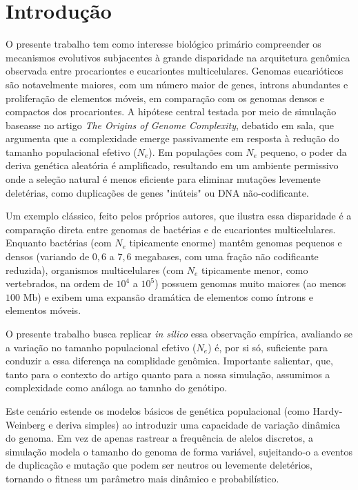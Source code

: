 \section{Introdução}

O presente trabalho tem como interesse biológico primário compreender os mecanismos evolutivos subjacentes à grande disparidade na arquitetura genômica observada entre procariontes e eucariontes multicelulares. Genomas eucarióticos são notavelmente maiores, com um número maior de genes, introns abundantes e proliferação de elementos móveis, em comparação com os genomas densos e compactos dos procariontes. 
A hipótese central testada por meio de simulação baseasse no artigo \textit{The Origins of Genome Complexity}\cite{Lynch2003GenomeComplexity}, debatido em sala, que argumenta que a complexidade emerge passivamente em resposta à redução do tamanho populacional efetivo ($N_e$). Em populações com $N_e$ pequeno, o poder da deriva genética aleatória é amplificado, resultando em um ambiente permissivo onde a seleção natural é menos eficiente para eliminar mutações levemente deletérias, como duplicações de genes "inúteis" ou DNA não-codificante.

Um exemplo clássico, feito pelos próprios autores, que ilustra essa disparidade é a comparação direta entre genomas de bactérias e de eucariontes multicelulares. Enquanto bactérias (com $N_e$ tipicamente enorme) mantêm genomas pequenos e densos (variando de $0{,}6$ a $7{,}6$ megabases, com uma fração não codificante reduzida), organismos multicelulares (com $N_e$ tipicamente menor, como vertebrados, na ordem de $10^{4}$ a $10^{5}$) possuem genomas muito maiores (ao menos $100$ Mb) e exibem uma expansão dramática de elementos como íntrons e elementos móveis\cite{Lynch2003GenomeComplexity}.

O presente trabalho busca replicar \textit{in silico} essa observação empírica, avaliando se a variação no tamanho populacional efetivo ($N_e$) é, por si só, suficiente para conduzir a essa diferença na complidade genômica. Importante salientar, que, tanto para o contexto do artigo quanto para a nossa simulação, assumimos a complexidade como análoga ao tamnho do genótipo.

Este cenário estende os modelos básicos de genética populacional (como Hardy-Weinberg e deriva simples) ao introduzir uma capacidade de variação dinâmica do genoma. Em vez de apenas rastrear a frequência de alelos discretos, a simulação modela o tamanho do genoma de forma variável, sujeitando-o a eventos de duplicação e mutação que podem ser neutros ou levemente deletérios, tornando o fitness um parâmetro mais dinâmico e probabilístico.


